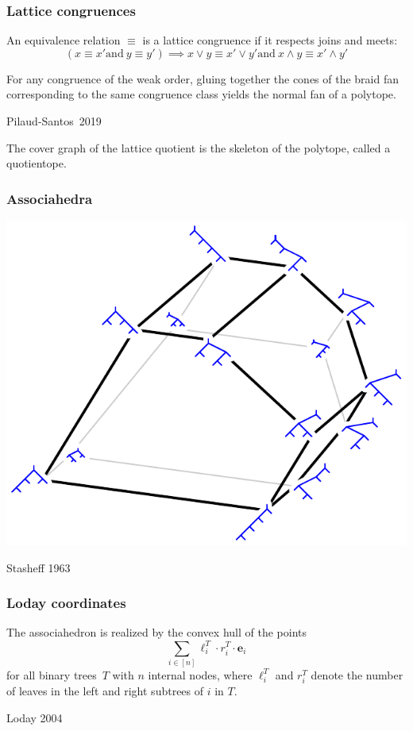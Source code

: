 \documentclass[11pt]{beamer}%
\newcommand{\red}{\color{darkred}}
\newcommand{\green}{\color{darkgreen}}
\newcommand{\auth}[1]{{\green\hfill{\footnotesize #1}}}
\renewcommand{\em }{\red}
\renewcommand{\b}[1]{{\boldsymbol{#1}}} %
\begin{document}
\begin{frame}
  \frametitle{Lattice congruences}
  An equivalence relation $\equiv$ is a {\em lattice congruence} if it respects joins and meets:
  $$
  (x\equiv x' \mathrm{and\ } y\equiv y')\implies x\vee y\equiv x'\vee y'\mathrm{and\ }  x\wedge y\equiv x'\wedge y' 
  $$
  \pause
  \begin{theorem}
    For any congruence of the weak order, gluing together the cones of the braid fan corresponding to the same congruence class yields the normal fan of a polytope.
  \end{theorem}
  \auth{Pilaud-Santos~2019}

  \pause
  The cover graph of the {\em lattice quotient} is the skeleton of the polytope, called a {\em quotientope}.
\end{frame}

\begin{frame}
  \frametitle{Associahedra}
    \begin{center}
      \includegraphics[height=.7\textheight]{associahedron4.pdf}
    \end{center}
    \auth{Stasheff 1963}
\end{frame}

\begin{frame}
  \frametitle{Loday coordinates}

  \begin{theorem}
  The associahedron is realized by the convex hull of the points
  \[
  \sum_{i\in [n]} \ell^T_i\cdot r^T_i \cdot \b{e}_i
  \]
  for all binary trees~$T$ with $n$ internal nodes, where $\ell^T_i$ and $r^T_i$ denote the number of leaves in the left and right subtrees of $i$ in $T$.
  \end{theorem}
  \auth{Loday 2004}  
\end{frame}
\end{document}
